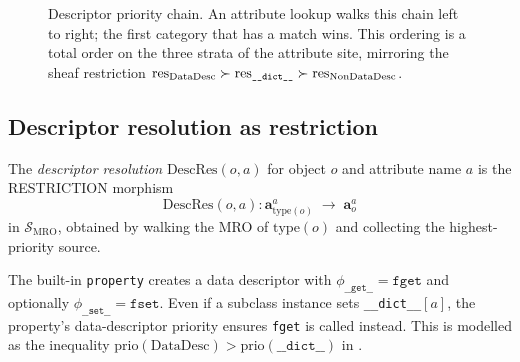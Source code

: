 \documentclass[11pt]{article}
\newcommand{\MROSite}{\mathcal{S}_{\mathrm{MRO}}} %
\newcommand{\Dget}{\texttt{\_\_get\_\_}}
\newcommand{\Dset}{\texttt{\_\_set\_\_}}
\newcommand{\DescData}{\mathrm{DataDesc}}
\newcommand{\DescND}{\mathrm{NonDataDesc}}
\newcommand{\DescRes}{\mathrm{DescRes}}           %
\newcommand{\InstDict}{\texttt{\_\_dict\_\_}}
\newcommand{\AttrCoord}[2]{\mathbf{a}_{#1}^{#2}} %
\newcommand{\DescMor}[1]{\phi_{#1}}               %
\newcommand{\prio}[1]{\mathrm{prio}(#1)}
\begin{document}
\begin{figure}[h]
  \centering
  \caption{Descriptor priority chain.  An attribute lookup walks this
    chain left to right; the first category that has a match wins.
    This ordering is a total order on the three strata of the attribute
    site, mirroring the sheaf restriction $\res_{\DescData} \succ
    \res_{\InstDict} \succ \res_{\DescND}$.}
  \label{fig:desc-priority}
\end{figure}

\subsection{Descriptor resolution as restriction}

\begin{definition}\label{def:desc-res}
  The \emph{descriptor resolution} $\DescRes(o, a)$ for object $o$ and
  attribute name $a$ is the RESTRICTION morphism
  \[
    \DescRes(o, a)\colon
    \AttrCoord{\mathrm{type}(o)}{a} \;\longrightarrow\; \AttrCoord{o}{a}
  \]
  in $\MROSite$, obtained by walking the MRO of $\mathrm{type}(o)$ and
  collecting the highest-priority source.
\end{definition}

\begin{example}\label{ex:property}
  The built-in \texttt{property} creates a data descriptor with
  $\DescMor{\Dget} = \texttt{fget}$ and optionally $\DescMor{\Dset} =
  \texttt{fset}$.  Even if a subclass instance sets \InstDict{}$[a]$,
  the property's data-descriptor priority ensures \texttt{fget} is
  called instead.  This is modelled as the inequality $\prio{\DescData}
  > \prio{\InstDict}$ in .
\end{example}
\end{document}
